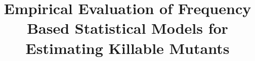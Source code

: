 \documentclass[sigconf,review,anonymous]{acmart}
\newcommand{\mytitle}{Empirical Evaluation of Frequency Based Statistical Models for Estimating Killable Mutants}
\begin{document}
\title{\mytitle}


%
%
%
%

%
%

\end{document}
